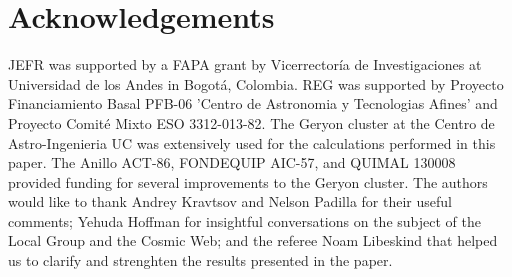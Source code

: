 \documentclass{emulateapj}
\begin{document}
\section*{Acknowledgements}
JEFR was supported by a FAPA grant by Vicerrector\'ia de
Investigaciones at Universidad de los Andes in Bogot\'a, Colombia.
REG was supported by Proyecto Financiamiento Basal PFB-06 'Centro de
Astronomia y Tecnologias Afines' and Proyecto Comit\'e Mixto ESO
3312-013-82. 
The Geryon cluster at the Centro de Astro-Ingenieria UC was
extensively used for the calculations performed in this paper. The
Anillo ACT-86, FONDEQUIP AIC-57, and QUIMAL 130008 provided funding
for several improvements to the Geryon cluster. 
The authors would like to thank Andrey Kravtsov and Nelson Padilla
for their useful comments; Yehuda Hoffman for insightful
conversations on the subject of the Local Group and the Cosmic Web;
and the referee Noam Libeskind  that helped us to clarify and
strenghten the results presented in the paper. 

% 
\end{document}
